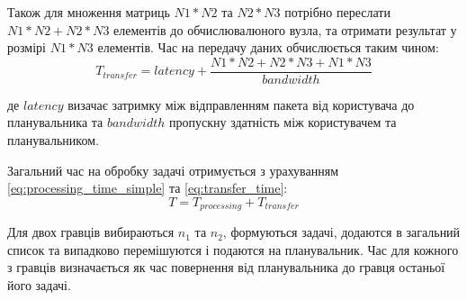 Також для множення матриць $N1*N2$ та $N2*N3$ потрібно переслати $N1*N2 + N2*N3$ елементів до обчислювалюного вузла, та отримати результат у розмірі $N1*N3$ елементів. Час на передачу даних обчислюється таким чином:
\begin{equation}
\label{eq:transfer_time}
T_{transfer} = latency + \frac{N1*N2+N2*N3+N1*N3}{bandwidth}
\end{equation}
\par де $latency$ визачає затримку між відправленням пакета від користувача до планувальника та $bandwidth$ пропускну здатність між користувачем та планувальником.

Загальний час на обробку задачі отримується з урахуванням \ref{eq:processing_time_simple} та \ref{eq:transfer_time}:
\begin{equation}
\label{eq:total_task_processing_time}
T = T_{processing} + T_{transfer}
\end{equation}

Для двох гравців вибираються $n_1$ та $n_2$, формуються задачі, додаются в загальний список та випадково перемішуются і подаются на планувальник. Час для кожного з гравців визначається як час повернення від планувальника до гравця останьої його задачі.